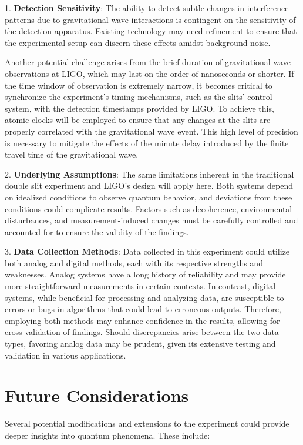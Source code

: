 \documentclass{article}
\begin{document}
1. \textbf{Detection Sensitivity}: The ability to detect subtle changes in interference patterns due to gravitational wave interactions is contingent on the sensitivity of the detection apparatus. Existing technology may need refinement to ensure that the experimental setup can discern these effects amidst background noise. 

Another potential challenge arises from the brief duration of gravitational wave observations at LIGO, which may last on the order of nanoseconds or shorter. If the time window of observation is extremely narrow, it becomes critical to synchronize the experiment’s timing mechanisms, such as the slits’ control system, with the detection timestamps provided by LIGO. To achieve this, atomic clocks will be employed to ensure that any changes at the slits are properly correlated with the gravitational wave event. This high level of precision is necessary to mitigate the effects of the minute delay introduced by the finite travel time of the gravitational wave.

2. \textbf{Underlying Assumptions}: The same limitations inherent in the traditional double slit experiment and LIGO's design will apply here. Both systems depend on idealized conditions to observe quantum behavior, and deviations from these conditions could complicate results. Factors such as decoherence, environmental disturbances, and measurement-induced changes must be carefully controlled and accounted for to ensure the validity of the findings.

3. \textbf{Data Collection Methods}: Data collected in this experiment could utilize both analog and digital methods, each with its respective strengths and weaknesses. Analog systems have a long history of reliability and may provide more straightforward measurements in certain contexts. In contrast, digital systems, while beneficial for processing and analyzing data, are susceptible to errors or bugs in algorithms that could lead to erroneous outputs. Therefore, employing both methods may enhance confidence in the results, allowing for cross-validation of findings. Should discrepancies arise between the two data types, favoring analog data may be prudent, given its extensive testing and validation in various applications.

\section{Future Considerations}

Several potential modifications and extensions to the experiment could provide deeper insights into quantum phenomena. These include:
\end{document}
